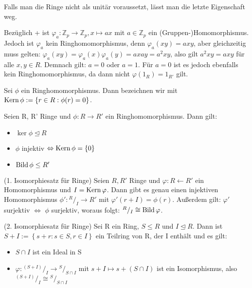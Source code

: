\documentclass[10pt]{scrbook}
\begin{document}
\begin{Bem}
Falls man die Ringe nicht als unitär voraussetzt, lässt man die letzte Eigenschaft weg.
\end{Bem}

\begin{Bsp}
Bezüglich + ist $\varphi_a: \mathbb{Z}_p\rightarrow \mathbb{Z}_p, x\mapsto a x$ mit $a\in \mathbb{Z}_p$ ein (Gruppen-)Homomorphismus. Jedoch ist $\varphi_a$ kein Ringhomomorphismus, denn $\varphi_a(x y)=a x y$, aber gleichzeitig muss gelten: $\varphi_a(x y)=\varphi_a(x) \varphi_a(y)=a x a y=a^2 x y$, also gilt $a^2 x y=a x y$ für alle $x, y\in R$. Demnach gilt: $a=0$ oder $a=1$. Für $a=0$ ist es jedoch ebenfalls kein Ringhomomorphismus, da dann nicht $\varphi(1_R)=1_{R'}$ gilt.
\end{Bsp}

\begin{Def}
Sei $\phi$ ein Ringhomomorphismus. Dann bezeichnen wir mit $\operatorname{Kern} \phi:=\{r\in R: \phi(r)=0\}$.
\end{Def}

\begin{Le}
Seien R, R' Ringe und $\phi: R\rightarrow R'$ ein Ringhomomorphismus. Dann gilt:
\begin{itemize}
	\item $\ker \phi\trianglelefteq R$
	\item $\phi$ injektiv $\Leftrightarrow \operatorname{Kern} \phi=\left\{0\right\}$
	\item $\operatorname{Bild} \phi\leq R'$
\end{itemize}
\end{Le}

\begin{Sa} (1. Isomorphiesatz für Ringe)
Seien $R, R'$ Ringe und $\varphi: R\leftarrow R'$ ein Homomorphismus und $I=\operatorname{Kern} \varphi$. Dann gibt es genau einen injektiven Homomorphismus $\phi': {}^R/_I\rightarrow R'$ mit $\varphi'(r+I)=\phi(r)$. Außerdem gilt: $\varphi'$ surjektiv $\Leftrightarrow$ $\phi$ surjektiv, woraus folgt: ${}^R/_I\cong \operatorname{Bild} \varphi$.
\end{Sa}

\begin{Sa} (2. Isomorphiesatz für Ringe)
Sei R ein Ring, $S\leq R$ und $I\trianglelefteq R$. Dann ist $S+I:=\left\{s+r: s\in S, r\in I\right\}$ ein Teilring von R, der I enthält und es gilt:
\begin{itemize}
	\item $S \cap I$ ist ein Ideal in S
	\item $\varphi: {}^{(S+I)}/_I\rightarrow {}^{S}/_{S\cap I}$ mit $s+I\mapsto s+(S\cap I)$ ist ein Isomorphismus, also ${}^{(S+I)}/_I\cong {}^{S}/_{S\cap I}$
\end{itemize}
\end{Sa}
\end{document}
